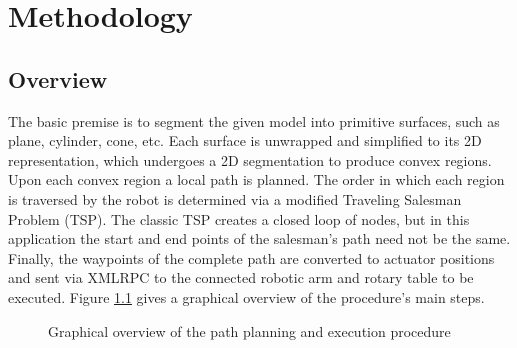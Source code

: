 \chapter{Methodology}

\section{Overview}
The basic premise is to segment the given model into primitive surfaces, such as plane, cylinder, cone, etc.
Each surface is unwrapped and simplified to its 2D representation, which undergoes a 2D segmentation to produce convex regions.
Upon each convex region a local path is planned.
The order in which each region is traversed by the robot is determined via a modified Traveling Salesman Problem (TSP).
The classic TSP creates a closed loop of nodes, but in this application the start and end points of the salesman's path need not be the same.
Finally, the waypoints of the complete path are converted to actuator positions and sent via XMLRPC to the connected robotic arm and rotary table to be executed.
Figure \ref{fig:mtdy_overview} gives a graphical overview of the procedure's main steps.

\begin{figure}[ht]
	\centering
{}
	\caption{Graphical overview of the path planning and execution procedure}
	\label{fig:mtdy_overview}
\end{figure}

